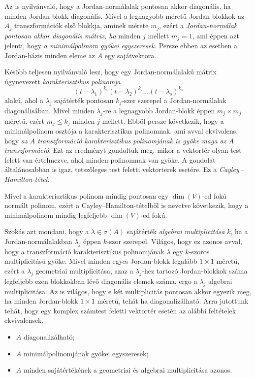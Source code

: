\documentclass[a4paper, showtrims]{memoir}
\theoremstyle{plain}
\theoremstyle{remark}
\theoremstyle{definition}
\begin{document}
Az is nyilvánvaló, hogy a Jordan-normálalak pontosan akkor diagonális, ha minden Jordan-blokk diagonális.
Mivel a legnagyobb méretű Jordan-blokkok az $A_j$ transzformációk első blokkja, aminek mérete $m_j$, ezért a \emph{Jordan-normálak pontosan akkor diagonális mátrix, ha} minden $j$ mellett $m_j=1$,
ami éppen azt jelenti, hogy \emph{a minimálpolinom gyökei egyszeresek.}
Persze ebben az esetben a Jordan-bázis minden eleme az $A$ egy sajátvektora.

Később teljesen nyilvánvaló lesz, hogy egy Jordan-normálalakú mátrix
úgynevezett \emph{karakterisztikus polinomja}
\[
	\left( t-\lambda_1 \right)^{k_1}\left( t-\lambda_2 \right)^{k_2}\dots\left( t-\lambda_s \right)^{k_s}
\]
alakú,
ahol a $\lambda_j$ sajátérték pontosan $k_j$-szer szerepel a Jordan-normálalak diagonálisában.
Mivel minden $\lambda_j$-re a legnagyobb Jordan-blokk éppen $m_j\times m_j$ méretű,
ezért $m_j\leq k_j$ minden $j$-mellett.
Ebből persze következik,
hogy a minimálpolinom osztója a karakterisztikus polinomnak, ami
avval ekvivalens,
hogy \emph{az $A$ transzformáció karakterisztikus polinomjának is gyöke maga az $A$ transzformáció}.
Ezt az eredményt gondoltuk meg, mikor a vektortér olyan test felett van értelmezve,
ahol minden polinomnak van gyöke.
A gondolat általánosabban is igaz, tetszőleges test feletti vektorterek esetére.
Ez a \emph{Cayley\,--\,Hamilton-tétel}.

Mivel a karakterisztikus polinom mindig pontosan egy $\dim(V)$-ed fokú normált polinom,
ezért a Cayley--Hamilton-tételből is nevetve következik,
hogy a minimálpolinom mindig legfeljebb $\dim(V)$-ed fokú.

Szokás azt mondani, hogy a $\lambda\in\sigma\left( A \right)$ sajátérték
\emph{algebrai multiplicitása} $k$,
ha a Jordan-normál\-a\-lak\-ban $\lambda_j$ éppen $k$-szor szerepel.
Világos, hogy ez azonos avval, hogy a transzformáció karakterisztikus polinomjának
$\lambda$ egy $k$-szoros multiplicitású gyöke.
Mivel minden egyes Jordan-blokk legalább $1\times 1$ méretű,
ezért a $\lambda_j$ geometriai multiplicitása,
azaz a $\lambda_j$-hez tartozó Jordan-blokkok száma legfeljebb ezen blokkokban lévő diagonális elemek száma,
ergo a $\lambda_j$ algebrai multiplicitása.
Az is világos, hogy e két multiplicitás pontosan akkor egyezik meg,
ha minden Jordan-blokk $1\times 1$ méretű, tehát ha diagonalizálható.
Arra jutottunk tehát,
hogy egy komplex számtest feletti vektortér esetén az alábbi feltételek ekvivalensek.
\begin{itemize}\tightlist
	\item[\textendash] $A$ diagonalizálható;
	\item[\textendash] $A$ minimálpolinomjának gyökei egyszeresek;
	\item[\textendash] $A$ minden sajátértékének a geometriai és algebrai multiplicitása azonos.
\end{itemize}
\end{document}

